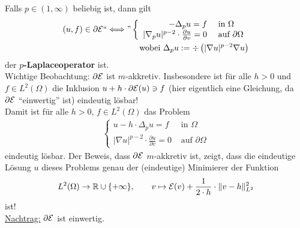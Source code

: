 \begin{beispiel}
Falls $p\in(1,\infty)$ beliebig ist, dann gilt
\begin{align*}
(u,f)\in\partial\mathcal{E}``\Longleftrightarrow\text{''}\left\lbrace\begin{array}{rl}
-\Delta_p u=f&\text{ in }\Omega\\
|\nabla_p u|^{p-2}\cdot\frac{\partial u}{\partial v}=0 &\text{ auf }\partial\Omega
\end{array}\right.\\
\text{ wobei }\Delta_p u:=\div\left(|\nabla u|^{p-2}\nabla u\right)
\end{align*}
der \textbf{$p$-Laplaceoperator} ist.\\
Wichtige Beobachtung: $\partial\mathcal{E}$ ist $m$-akkretiv. Insbesondere ist für alle $h>0$ und $f\in L^2(\Omega)$ die Inklusion $u+h\cdot\partial\mathcal{E}(u)\ni f$ (hier eigentlich eine Gleichung, da $\partial\mathcal{E}$ ``einwertig'' ist) eindeutig lösbar!\\
Damit ist für alle $h>0$, $f\in L^2(\Omega)$ das Problem
\begin{align*}
\left\lbrace\begin{array}{rl}
u-h\cdot\Delta_p u=f &\text{ in }\Omega\\
|\nabla u|^{p-2}\cdot\frac{\partial u}{\partial v}=0 &\text{ auf } \partial\Omega
\end{array}\right.
\end{align*}
eindeutig lösbar. Der Beweis, dass $\partial\mathcal{E}$ $m$-akkretiv ist, zeigt, dass die eindeutige Lösung $u$ dieses Problems genau der (eindeutige) Minimierer der Funktion
\begin{align*}
L^2(\Omega)\to\mathbb{R}\cup\lbrace+\infty\rbrace,\qquad
v\mapsto\mathcal{E}(v)+\frac{1}{2\cdot h}\cdot\Vert v-h\Vert_{L^2}^2
\end{align*}
ist!\\
\underline{Nachtrag:} $\partial\mathcal{E}$ ist einwertig.


\end{beispiel}
